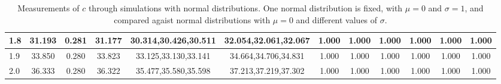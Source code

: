 \begin{table*}[h!]
\begin{center}
\begin{tabular}{| l | c | c | c | c | c | c | c | c | c | c | c |}
1.8 & 31.193 & 0.281 & 31.177 & 30.314,30.426,30.511 & 32.054,32.061,32.067  & 1.000  & 1.000  & 1.000  & 1.000  & 1.000  & 1.000 \\\hline
1.9 & 33.850 & 0.280 & 33.823 & 33.125,33.130,33.141 & 34.664,34.706,34.831  & 1.000  & 1.000  & 1.000  & 1.000  & 1.000  & 1.000 \\\hline
2.0 & 36.333 & 0.280 & 36.322 & 35.477,35.580,35.598 & 37.213,37.219,37.302  & 1.000  & 1.000  & 1.000  & 1.000  & 1.000  & 1.000 \\\hline
\end{tabular}
\caption{Measurements of $c$ through simulations
with normal distributions.
One normal distribution is fixed, with $\mu=0$ and $\sigma=1$,
and compared agaist normal distributions with $\mu=0$
and different values of $\sigma$.}
\end{center}
\end{table*}